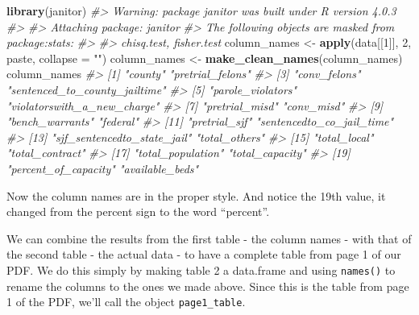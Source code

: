 \documentclass[
  12pt,
]{book}
\newenvironment{Shaded}{\begin{snugshade}}{\end{snugshade}}
\newcommand{\CommentTok}[1]{\textcolor[rgb]{0.37,0.37,0.37}{\textit{#1}}}
\newcommand{\DataTypeTok}[1]{\textcolor[rgb]{0.27,0.27,0.27}{#1}}
\newcommand{\DecValTok}[1]{\textcolor[rgb]{0.06,0.06,0.06}{#1}}
\newcommand{\KeywordTok}[1]{\textcolor[rgb]{0.27,0.27,0.27}{\textbf{#1}}}
\newcommand{\NormalTok}[1]{#1}
\newcommand{\StringTok}[1]{\textcolor[rgb]{0.5,0.5,0.5}{#1}}
\begin{document}
\begin{Shaded}
\begin{Highlighting}[]
\KeywordTok{library}\NormalTok{(janitor)}
\CommentTok{\#\textgreater{} Warning: package \textquotesingle{}janitor\textquotesingle{} was built under R version 4.0.3}
\CommentTok{\#\textgreater{} }
\CommentTok{\#\textgreater{} Attaching package: \textquotesingle{}janitor\textquotesingle{}}
\CommentTok{\#\textgreater{} The following objects are masked from \textquotesingle{}package:stats\textquotesingle{}:}
\CommentTok{\#\textgreater{} }
\CommentTok{\#\textgreater{}     chisq.test, fisher.test}
\NormalTok{column\_names \textless{}{-}}\StringTok{ }\KeywordTok{apply}\NormalTok{(data[[}\DecValTok{1}\NormalTok{]], }\DecValTok{2}\NormalTok{, paste, }\DataTypeTok{collapse =} \StringTok{""}\NormalTok{)}
\NormalTok{column\_names \textless{}{-}}\StringTok{ }\KeywordTok{make\_clean\_names}\NormalTok{(column\_names)}
\NormalTok{column\_names}
\CommentTok{\#\textgreater{}  [1] "county"                       "pretrial\_felons"             }
\CommentTok{\#\textgreater{}  [3] "conv\_felons"                  "sentenced\_to\_county\_jailtime"}
\CommentTok{\#\textgreater{}  [5] "parole\_violators"             "violatorswith\_a\_new\_charge"  }
\CommentTok{\#\textgreater{}  [7] "pretrial\_misd"                "conv\_misd"                   }
\CommentTok{\#\textgreater{}  [9] "bench\_warrants"               "federal"                     }
\CommentTok{\#\textgreater{} [11] "pretrial\_sjf"                 "sentencedto\_co\_jail\_time"    }
\CommentTok{\#\textgreater{} [13] "sjf\_sentencedto\_state\_jail"   "total\_others"                }
\CommentTok{\#\textgreater{} [15] "total\_local"                  "total\_contract"              }
\CommentTok{\#\textgreater{} [17] "total\_population"             "total\_capacity"              }
\CommentTok{\#\textgreater{} [19] "percent\_of\_capacity"          "available\_beds"}
\end{Highlighting}
\end{Shaded}

Now the column names are in the proper style. And notice the 19th value, it changed from the percent sign to the word ``percent''.

We can combine the results from the first table - the column names - with that of the second table - the actual data - to have a complete table from page 1 of our PDF. We do this simply by making table 2 a data.frame and using \texttt{names()} to rename the columns to the ones we made above. Since this is the table from page 1 of the PDF, we'll call the object \texttt{page1\_table}.
\end{document}
